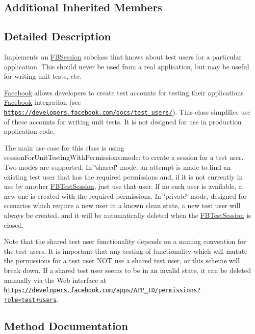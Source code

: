 \subsection*{Additional Inherited Members}


\subsection{Detailed Description}
Implements an \hyperlink{interfaceFBSession}{F\+B\+Session} subclass that knows about test users for a particular application. This should never be used from a real application, but may be useful for writing unit tests, etc.

\hyperlink{interfaceFacebook}{Facebook} allows developers to create test accounts for testing their applications\textquotesingle{} \hyperlink{interfaceFacebook}{Facebook} integration (see \href{https://developers.facebook.com/docs/test_users/}{\tt https\+://developers.\+facebook.\+com/docs/test\+\_\+users/}). This class simplifies use of these accounts for writing unit tests. It is not designed for use in production application code.

The main use case for this class is using session\+For\+Unit\+Testing\+With\+Permissions\+:mode\+: to create a session for a test user. Two modes are supported. In \char`\"{}shared\char`\"{} mode, an attempt is made to find an existing test user that has the required permissions and, if it is not currently in use by another \hyperlink{interfaceFBTestSession}{F\+B\+Test\+Session}, just use that user. If no such user is available, a new one is created with the required permissions. In \char`\"{}private\char`\"{} mode, designed for scenarios which require a new user in a known clean state, a new test user will always be created, and it will be automatically deleted when the \hyperlink{interfaceFBTestSession}{F\+B\+Test\+Session} is closed.

Note that the shared test user functionality depends on a naming convention for the test users. It is important that any testing of functionality which will mutate the permissions for a test user N\+OT use a shared test user, or this scheme will break down. If a shared test user seems to be in an invalid state, it can be deleted manually via the Web interface at \href{https://developers.facebook.com/apps/APP_ID/permissions?role=test+users}{\tt https\+://developers.\+facebook.\+com/apps/\+A\+P\+P\+\_\+\+I\+D/permissions?role=test+users}. 

\subsection{Method Documentation}
\mbox{\label{interfaceFBTestSession_a435c3fc5a918dc5d0a4cfb05cf95e454}} 
